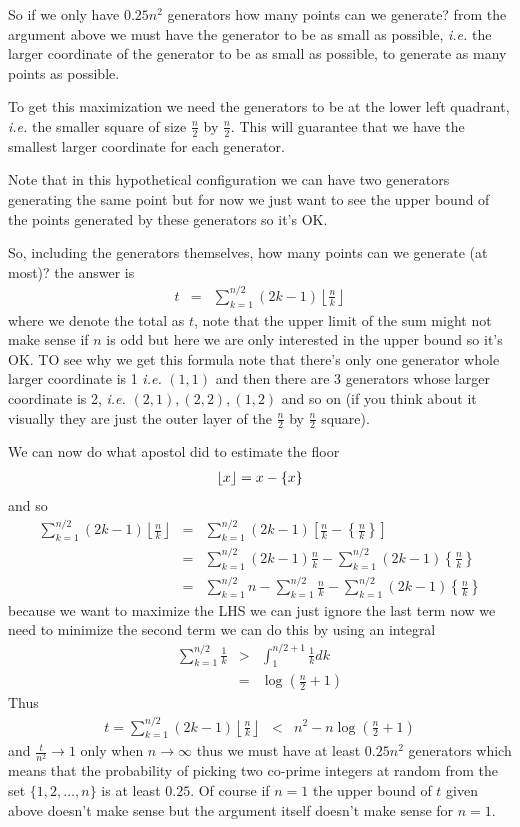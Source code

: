 \documentclass[aps,preprint,preprintnumbers,nofootinbib,showpacs,prd]{revtex4-1}
\newcommand{\ie}{{\it i.e.} }
\newcommand{\nbea}{\begin{eqnarray*}}
\newcommand{\neea}{\end{eqnarray*}}
\DeclarePairedDelimiter{\floor}{\lfloor}{\rfloor}
\begin{document}
So if we only have $0.25 n^2$ generators how many points can we generate? from the argument above we must have the generator to be as small as possible, \ie the larger coordinate of the generator to be as small as possible, to generate as many points as possible.

To get this maximization we need the generators to be at the lower left quadrant, \ie the smaller square of size $\frac{n}{2}$ by $\frac{n}{2}$. This will guarantee that we have the smallest larger coordinate for each generator.

Note that in this hypothetical configuration we can have two generators generating the same point but for now we just want to see the upper bound of the points generated by these generators so it's OK.

So, including the generators themselves, how many points can we generate (at most)? the answer is 
%
\nbea
t & = & \sum_{k = 1}^{n/2} (2k - 1) \left \lfloor \frac{n}{k} \right \rfloor
\neea
%
where we denote the total as $t$, note that the upper limit of the sum might not make sense if $n$ is odd but here we are only interested in the upper bound so it's OK. TO see why we get this formula note that there's only one generator whole larger coordinate is 1 \ie $(1,1)$ and then there are 3 generators whose larger coordinate is 2, \ie $(2,1),(2,2),(1,2)$ and so on (if you think about it visually they are just the outer layer of the $\tfrac{n}{2}$ by $\tfrac{n}{2}$ square).

We can now do what apostol did to estimate the floor 
%
\nbea
\floor{x} = x - \{ x \}
\neea
%
and so 
%
\nbea
\sum_{k = 1}^{n/2} (2k - 1) \left \lfloor \frac{n}{k} \right \rfloor & = & \sum_{k = 1}^{n/2} (2k - 1) \left \lbrack \frac{n}{k}  - \left \{ \frac{n}{k} \right \} \right \rbrack \\
& = & \sum_{k = 1}^{n/2} (2k - 1) \frac{n}{k}  - \sum_{k = 1}^{n/2} (2k - 1)\left \{ \frac{n}{k} \right \} \\
& = & \sum_{k = 1}^{n/2} n - \sum_{k = 1}^{n/2} \frac{n}{k} - \sum_{k = 1}^{n/2} (2k - 1) \left \{ \frac{n}{k} \right \} 
\neea
%
because we want to maximize the LHS we can just ignore the last term now we need to minimize the second term we can do this by using an integral 
%
\nbea
\sum_{k = 1}^{n/2} \frac{1}{k} & > & \int_1^{n/2 + 1} \frac{1}{k} dk \\
& = & \log (\tfrac{n}{2} + 1)
\neea
%
Thus 
%
\nbea
t = \sum_{k = 1}^{n/2} (2k - 1) \left \lfloor \frac{n}{k} \right \rfloor & < & n^2 - n \log (\tfrac{n}{2} +1)
\neea
%
and $\frac{t}{n^2} \to 1$ only when $n \to \infty$ thus we must have at least $0.25 n^2$ generators which means that the probability of picking two co-prime integers at random from the set $\{1,2,\dots,n\}$ is at least $0.25$. Of course if $n = 1$ the upper bound of $t$ given above doesn't make sense but the argument itself doesn't make sense for $n=1$.
\end{document}
